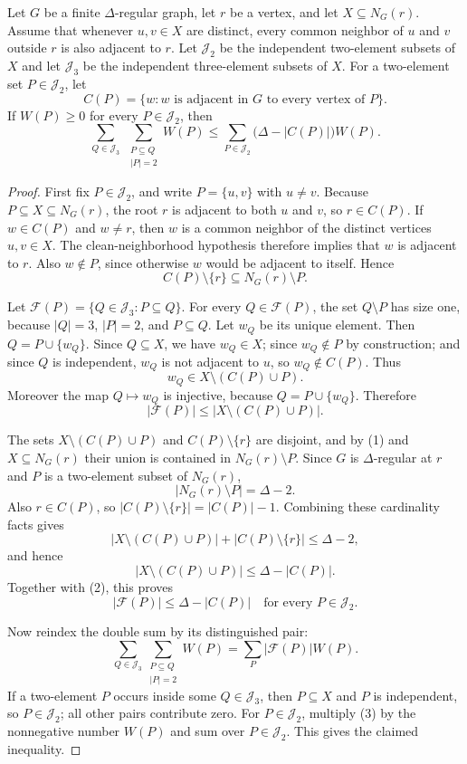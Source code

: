 \begin{helper}
Let $G$ be a finite $\Delta$-regular graph, let $r$ be a vertex, and let
$X\subseteq N_G(r)$.  Assume that whenever $u,v\in X$ are distinct, every
common neighbor of $u$ and $v$ outside $r$ is also adjacent to $r$.  Let
$\mathcal J_2$ be the independent two-element subsets of $X$ and let
$\mathcal J_3$ be the independent three-element subsets of $X$.  For a
two-element set $P\in\mathcal J_2$, let
\[
C(P)=\{w:\text{$w$ is adjacent in $G$ to every vertex of $P$}\}.
\]
If $W(P)\ge0$ for every $P\in\mathcal J_2$, then
\[
\sum_{Q\in\mathcal J_3}\ \sum_{\substack{P\subseteq Q\\ |P|=2}} W(P)
\le
\sum_{P\in\mathcal J_2}\bigl(\Delta-|C(P)|\bigr)W(P).
\]
\end{helper}
\begin{proof}
First fix $P\in\mathcal J_2$, and write $P=\{u,v\}$ with $u\ne v$.  Because
$P\subseteq X\subseteq N_G(r)$, the root $r$ is adjacent to both $u$ and
$v$, so $r\in C(P)$.  If $w\in C(P)$ and $w\ne r$, then $w$ is a common
neighbor of the distinct vertices $u,v\in X$.  The clean-neighborhood
hypothesis therefore implies that $w$ is adjacent to $r$.  Also $w\notin P$,
since otherwise $w$ would be adjacent to itself.  Hence
\[
C(P)\setminus\{r\}\subseteq N_G(r)\setminus P. \tag{1}
\]

Let $\mathcal F(P)=\{Q\in\mathcal J_3:P\subseteq Q\}$.  For every
$Q\in\mathcal F(P)$, the set $Q\setminus P$ has size one, because
$|Q|=3$, $|P|=2$, and $P\subseteq Q$.  Let $w_Q$ be its unique element.
Then $Q=P\cup\{w_Q\}$.  Since $Q\subseteq X$, we have $w_Q\in X$; since
$w_Q\notin P$ by construction; and since $Q$ is independent, $w_Q$ is not
adjacent to $u$, so $w_Q\notin C(P)$.  Thus
\[
w_Q\in X\setminus(C(P)\cup P).
\]
Moreover the map $Q\mapsto w_Q$ is injective, because
$Q=P\cup\{w_Q\}$.  Therefore
\[
|\mathcal F(P)|\le |X\setminus(C(P)\cup P)|. \tag{2}
\]

The sets $X\setminus(C(P)\cup P)$ and $C(P)\setminus\{r\}$ are disjoint,
and by (1) and $X\subseteq N_G(r)$ their union is contained in
$N_G(r)\setminus P$.  Since $G$ is $\Delta$-regular at $r$ and $P$ is a
two-element subset of $N_G(r)$,
\[
|N_G(r)\setminus P|=\Delta-2.
\]
Also $r\in C(P)$, so $|C(P)\setminus\{r\}|=|C(P)|-1$.  Combining these
cardinality facts gives
\[
|X\setminus(C(P)\cup P)|+|C(P)\setminus\{r\}|
\le \Delta-2,
\]
and hence
\[
|X\setminus(C(P)\cup P)|\le \Delta-|C(P)|.
\]
Together with (2), this proves
\[
|\mathcal F(P)|\le \Delta-|C(P)|
\quad\text{for every }P\in\mathcal J_2. \tag{3}
\]

Now reindex the double sum by its distinguished pair:
\[
\sum_{Q\in\mathcal J_3}\sum_{\substack{P\subseteq Q\\ |P|=2}} W(P)
=
\sum_P |\mathcal F(P)|W(P).
\]
If a two-element $P$ occurs inside some $Q\in\mathcal J_3$, then
$P\subseteq X$ and $P$ is independent, so $P\in\mathcal J_2$; all other
pairs contribute zero.  For $P\in\mathcal J_2$, multiply (3) by the
nonnegative number $W(P)$ and sum over $P\in\mathcal J_2$.  This gives the
claimed inequality.
\end{proof}
